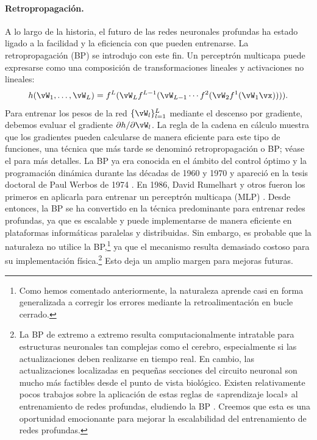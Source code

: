 \documentclass[../../book-main_es.tex]{subfiles}
\begin{document}
\paragraph{Retropropagación.}
A lo largo de la historia, el futuro de las redes neuronales profundas ha estado ligado a
la facilidad y la eficiencia con que pueden entrenarse. La retropropagación (BP)
se introdujo con este fin. Un perceptrón multicapa puede expresarse como una 
composición de transformaciones lineales y activaciones no lineales:
\begin{equation}
    h(\vW_{1}, \ldots, \vW_{L}) = f^{L}(\vW_{L}f^{L-1}(\vW_{L-1}
    \cdots f^{2}(\vW_{2}f^{1}(\vW_{1}\vx)))).
\end{equation}
Para entrenar los pesos de la red \(\{\vW_{l}\}_{l=1}^{L}\) mediante el
descenso por gradiente, debemos evaluar el gradiente \(\partial h/\partial
\vW_{l}\). La regla de la cadena en cálculo muestra que los gradientes pueden
calcularse de manera eficiente para este tipo de funciones, una técnica que más tarde se denominó
retropropagación o BP; véase el  para más detalles. La BP
ya era conocida en el ámbito del control óptimo y la programación dinámica durante
las décadas de 1960 y 1970 y apareció en la tesis doctoral de Paul Werbos de 1974
\cite{Werbos-1974, Werbos1994TheRO}. En 1986, David Rumelhart y otros
fueron los primeros en aplicarla para entrenar un perceptrón multicapa (MLP)
\cite{Rumelhart1986}. Desde entonces, la BP se ha convertido en la técnica predominante
para entrenar redes profundas, ya que es escalable y puede
implementarse de manera eficiente en plataformas informáticas
paralelas y distribuidas. Sin embargo, es probable que la naturaleza no utilice la BP,\footnote{Como
    hemos comentado anteriormente, la naturaleza aprende casi en forma generalizada a corregir
los errores mediante la retroalimentación en bucle cerrado.} ya que el mecanismo resulta demasiado costoso
para su implementación física.\footnote{La BP de extremo a extremo
    resulta computacionalmente intratable para estructuras neuronales tan complejas como el
    cerebro, especialmente si las actualizaciones deben realizarse en tiempo real.
    En cambio, las actualizaciones localizadas en pequeñas secciones del circuito neuronal
    son mucho más factibles desde el punto de vista biológico. Existen relativamente pocos
    trabajos sobre la aplicación de estas reglas de «aprendizaje local» al
    entrenamiento de redes profundas, eludiendo la BP
    \cite{baldi2016theory,millidge2022predictive,li2025noprop}. Creemos
    que esta es una oportunidad emocionante para mejorar la escalabilidad del
entrenamiento de redes profundas.} Esto deja un amplio margen para mejoras futuras.
\end{document}
